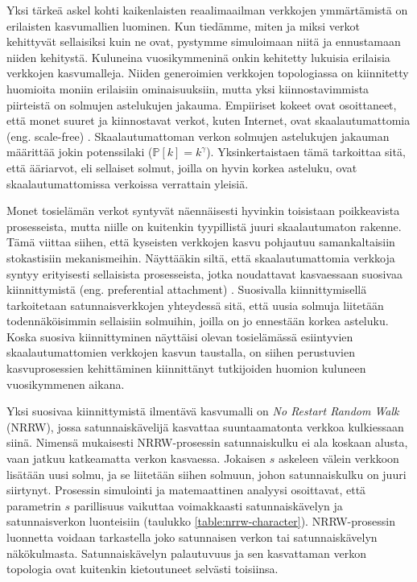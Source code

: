 \documentclass[finnish, 12pt, a4paper, sci, utf8, pdfa]{aaltothesis}
\newcommand*{\prob}{\mathbb{P}}
\begin{document}
Yksi tärkeä askel kohti kaikenlaisten reaalimaailman verkkojen ymmärtämistä on erilaisten kasvumallien luominen. Kun tiedämme, miten ja miksi verkot kehittyvät sellaisiksi kuin ne ovat,
pystymme simuloimaan niitä ja ennustamaan niiden kehitystä. Kuluneina vuosikymmeninä onkin kehitetty lukuisia erilaisia verkkojen kasvumalleja. Niiden generoimien verkkojen
topologiassa on kiinnitetty huomioita moniin erilaisiin ominaisuuksiin, mutta yksi kiinnostavimmista piirteistä on solmujen astelukujen jakauma. Empiiriset kokeet ovat osoittaneet, 
että monet suuret ja kiinnostavat verkot, kuten Internet, ovat skaalautumattomia (eng. scale-free) \cite{Clauset}. Skaalautumattoman verkon solmujen astelukujen jakauman määrittää jokin 
potenssilaki ($ \prob \left[ k \right] = k^{\gamma} $). Yksinkertaistaen tämä tarkoittaa sitä, että ääriarvot, eli sellaiset solmut, joilla on hyvin korkea asteluku, ovat 
skaalautumattomissa verkoissa verrattain yleisiä. \cite{Babarasi-kirja} 

Monet tosielämän verkot syntyvät näennäisesti hyvinkin toisistaan poikkeavista prosesseista, mutta niille on kuitenkin tyypillistä juuri skaalautumaton rakenne. Tämä viittaa siihen,
että kyseisten verkkojen kasvu pohjautuu samankaltaisiin stokastisiin mekanismeihin. Näyttääkin siltä, että skaalautumattomia verkkoja syntyy erityisesti sellaisista prosesseista, 
jotka noudattavat kasvaessaan suosivaa kiinnittymistä (eng. preferential attachment) \cite{Babarasi}. Suosivalla kiinnittymisellä tarkoitetaan satunnaisverkkojen yhteydessä sitä, että uusia 
solmuja liitetään todennäköisimmin sellaisiin solmuihin, joilla on jo ennestään korkea asteluku. Koska suosiva kiinnittyminen näyttäisi olevan tosielämässä esiintyvien skaalautumattomien
verkkojen kasvun taustalla, on siihen perustuvien kasvuprosessien kehittäminen kiinnittänyt tutkijoiden huomion kuluneen vuosikymmenen aikana. 

Yksi suosivaa kiinnittymistä ilmentävä kasvumalli on \textit{No Restart Random Walk} (NRRW), jossa satunnaiskävelijä kasvattaa suuntaamatonta verkkoa kulkiessaan siinä. Nimensä 
mukaisesti NRRW-prosessin satunnaiskulku ei ala koskaan alusta, vaan jatkuu katkeamatta verkon kasvaessa. Jokaisen $ s $ askeleen välein verkkoon lisätään uusi solmu, ja se liitetään siihen solmuun, johon satunnaiskulku on juuri siirtynyt. Prosessin simulointi ja matemaattinen analyysi osoittavat, että parametrin $ s $ parillisuus vaikuttaa voimakkaasti satunnaiskävelyn ja satunnaisverkon luonteisiin (taulukko \ref{table:nrrw-character}). NRRW-prosessin luonnetta voidaan tarkastella joko satunnaisen verkon tai satunnaiskävelyn näkökulmasta. Satunnaiskävelyn palautuvuus ja sen kasvattaman verkon topologia ovat kuitenkin kietoutuneet selvästi toisiinsa. \cite{Iacobelli}
\end{document}
